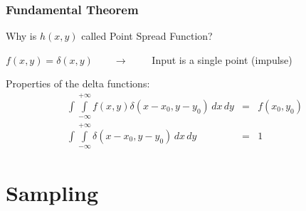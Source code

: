 \begin{frame}
    \frametitle{Fundamental Theorem}
    \question Why is $h(x,y)$ called Point Spread Function?\newline

    \answer
    \begin{center}
        $f(x,y) = \delta(x,y) \quad \quad \rightarrow \quad \quad$ Input is a single point (impulse)
    \end{center}

    \vspace{5 mm}

    Properties of the delta functions:
    \begin{eqnarray*}
        \int\int\limits_{-\infty}^{+\infty} f(x,y)\delta(x-x_0,y-y_0) \, dx\, dy &=& f(x_0,y_0)\\
        \int\int\limits_{-\infty}^{+\infty} \delta(x-x_0,y-y_0) \, dx\, dy &=& 1
    \end{eqnarray*}
\end{frame}
%
%
%
%

\subtitle{Sampling}
\frame[plain,c]{\titlepage}

\section{Sampling}%
\label{sec:sampling}


